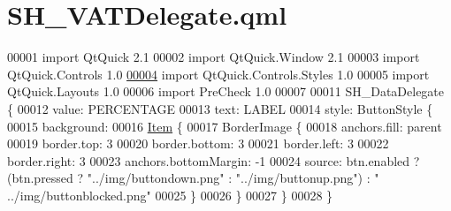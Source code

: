 \hypertarget{SH__VATDelegate_8qml}{\section{S\-H\-\_\-\-V\-A\-T\-Delegate.\-qml}
\label{SH__VATDelegate_8qml}
}

\begin{DoxyCode}
00001 \textcolor{keyword}{import} QtQuick 2.1
00002 import QtQuick.Window 2.1
00003 import QtQuick.Controls 1.0
\hypertarget{SH__VATDelegate_8qml_source_l00004}{}\hyperlink{classSH__VATDelegate}{00004} import QtQuick.Controls.Styles 1.0
00005 import QtQuick.Layouts 1.0
00006 import PreCheck 1.0
00007 
00011 SH\_DataDelegate \{
00012     value: PERCENTAGE
00013     text: LABEL
00014     style: ButtonStyle \{
00015         background:
00016             \hyperlink{classItem}{Item} \{
00017             BorderImage \{
00018                 anchors.fill: parent
00019                 border.top: 3
00020                 border.bottom: 3
00021                 border.left: 3
00022                 border.right: 3
00023                 anchors.bottomMargin: -1
00024                 source: btn.enabled ? (btn.pressed ? \textcolor{stringliteral}{"../img/buttondown.png"} : \textcolor{stringliteral}{"../img/buttonup.png"}) : \textcolor{stringliteral}{"
      ../img/buttonblocked.png"}
00025             \}
00026         \}
00027     \}
00028 \}
\end{DoxyCode}
